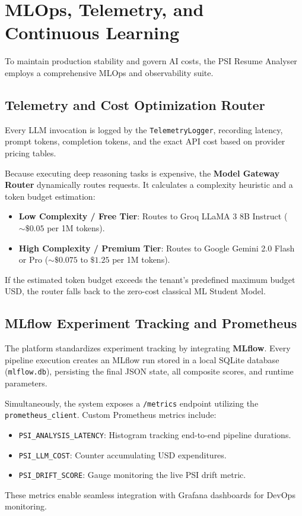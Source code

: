 \documentclass[10pt,journal,compsoc]{IEEEtran}
\begin{document}
\section{MLOps, Telemetry, and Continuous Learning}\label{sec:mlops}

To maintain production stability and govern AI costs, the PSI Resume Analyser employs a comprehensive MLOps and observability suite.

\subsection{Telemetry and Cost Optimization Router}
Every LLM invocation is logged by the \texttt{TelemetryLogger}, recording latency, prompt tokens, completion tokens, and the exact API cost based on provider pricing tables. 

Because executing deep reasoning tasks is expensive, the \textbf{Model Gateway Router} dynamically routes requests. It calculates a complexity heuristic and a token budget estimation:
\begin{itemize}
    \item \textbf{Low Complexity / Free Tier}: Routes to Groq LLaMA 3 8B Instruct ($\sim \$0.05$ per 1M tokens).
    \item \textbf{High Complexity / Premium Tier}: Routes to Google Gemini 2.0 Flash or Pro ($\sim \$0.075$ to $\$1.25$ per 1M tokens).
\end{itemize}
If the estimated token budget exceeds the tenant's predefined maximum budget USD, the router falls back to the zero-cost classical ML Student Model.

\subsection{MLflow Experiment Tracking and Prometheus}
The platform standardizes experiment tracking by integrating \textbf{MLflow}. Every pipeline execution creates an MLflow run stored in a local SQLite database (\texttt{mlflow.db}), persisting the final JSON state, all composite scores, and runtime parameters.

Simultaneously, the system exposes a \texttt{/metrics} endpoint utilizing the \texttt{prometheus\_client}. Custom Prometheus metrics include:
\begin{itemize}
    \item \texttt{PSI\_ANALYSIS\_LATENCY}: Histogram tracking end-to-end pipeline durations.
    \item \texttt{PSI\_LLM\_COST}: Counter accumulating USD expenditures.
    \item \texttt{PSI\_DRIFT\_SCORE}: Gauge monitoring the live PSI drift metric.
\end{itemize}
These metrics enable seamless integration with Grafana dashboards for DevOps monitoring.
\end{document}
